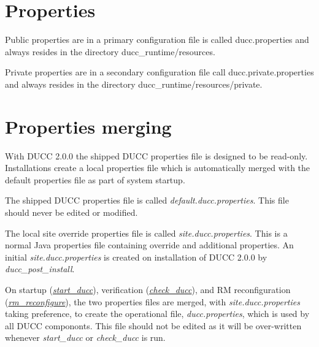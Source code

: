 % 
% 
% 
% 

\section{Properties}
 	
 	Public properties are in a primary configuration file is called ducc.properties 
	and always resides in the directory
    ducc\_runtime/resources.

	Private properties are in a secondary configuration file call ducc.private.properties
	and always resides in the directory
    ducc\_runtime/resources/private.

\section{Properties merging}
\label{sec:admin.properties-merge}
    
    With DUCC 2.0.0 the shipped DUCC properties file is designed to be read-only.  Installations
    create a local properties file which is automatically merged with the default properties file
    as part of system startup.

    The shipped DUCC properties file is called {\em default.ducc.properties}.  This file should
    never be edited or modified.

    The local site override properties file is called {\em site.ducc.properties}.  This is a 
    normal Java properties file containing override and additional properties.  An initial
    {\em site.ducc.properties} is created on installation of DUCC 2.0.0 by {\em ducc\_post\_install}.

    On startup 
    (\hyperref[subsec:admin.start-ducc]{\em start\_ducc}), 
    verification 
    (\hyperref[subsec:admin.check-ducc]{\em check\_ducc}),     
    and RM reconfiguration
    (\hyperref[subsec:admin.rm-reconfigure]{\em rm\_reconfigure}),     
    the two properties files are
    merged, with {\em site.ducc.properties} taking preference, to create the operational file,
    {\em ducc.properties}, which is used by all DUCC compononts.  This file should not be
    edited as it will be over-written whenever {\em start\_ducc} or {\em check\_ducc} is run.

